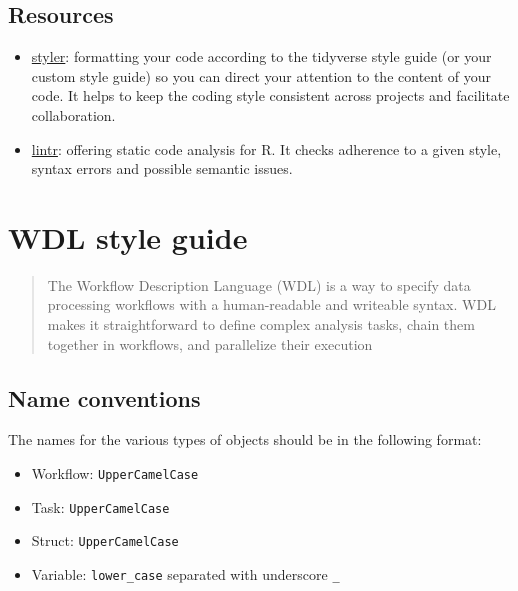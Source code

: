 \documentclass[
]{book}
\providecommand{\tightlist}{%
  \setlength{\itemsep}{0pt}\setlength{\parskip}{0pt}}
\begin{document}
\hypertarget{resources-1}{%
\section{Resources}\label{resources-1}}

\begin{itemize}
\tightlist
\item
  \href{https://github.com/r-lib/styler}{styler}: formatting your code according to
  the tidyverse style guide (or your custom style guide) so you can direct your
  attention to the content of your code. It helps to keep the coding style
  consistent across projects and facilitate collaboration.
\item
  \href{https://github.com/r-lib/lintr}{lintr}: offering static code analysis for R.
  It checks adherence to a given style, syntax errors and possible semantic
  issues.
\end{itemize}

\hypertarget{wdl-style-guide}{%
\chapter{WDL style guide}\label{wdl-style-guide}}

\begin{quote}
The Workflow Description Language (WDL) is a way to specify data processing
workflows with a human-readable and writeable syntax. WDL makes it
straightforward to define complex analysis tasks, chain them together in
workflows, and parallelize their execution
\end{quote}

\hypertarget{name-conventions}{%
\section{Name conventions}\label{name-conventions}}

The names for the various types of objects should be in the following format:

\begin{itemize}
\tightlist
\item
  Workflow: \texttt{UpperCamelCase}
\item
  Task: \texttt{UpperCamelCase}
\item
  Struct: \texttt{UpperCamelCase}
\item
  Variable: \texttt{lower\_case} separated with underscore \texttt{\_}
\end{itemize}
\end{document}
